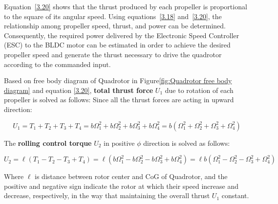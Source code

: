 \begin{small}
Equation~\eqref{3.20} shows that the thrust produced by each propeller is proportional 
to the square of its angular speed. Using equations~\eqref{3.18} and~\eqref{3.20}, the 
relationship among propeller speed, thrust, and power can be determined. Consequently, 
the required power delivered by the Electronic Speed Controller (ESC) to the BLDC motor 
can be estimated in order to achieve the desired propeller speed and generate the thrust 
necessary to drive the quadrotor according to the commanded input.








Based on free body diagram of Quadrotor in Figure\ref{fig:Quadrotor free body diagram} and equation \eqref{3.20}, 
\textbf{total thrust force} $U_1$ due to rotation of each propeller is solved as follows: 
Since all the thrust forces are acting in upward direction:

\begin{equation}
U_1 = T_1 + T_2 + T_3 + T_4 = b\Omega_1^2 + b\Omega_2^2 + b\Omega_3^2 + b\Omega_4^2 = b(\Omega_1^2 + \Omega_2^2 + \Omega_3^2 + \Omega_4^2)
\label{3.21}
\end{equation}


The \textbf{rolling control torque} $U_2$ in positive $\phi$ direction is solved as follows:

\begin{equation}
U_2 = \ell (T_1 - T_2 - T_3 + T_4) 
    = \ell (b\Omega_1^2 - b\Omega_2^2 - b\Omega_3^2 + b\Omega_4^2)  = \ell b(\Omega_1^2 - \Omega_2^2 - \Omega_3^2 + \Omega_4^2)
    \label{3.22}
\end{equation}


Where $\ell$ is distance between rotor center and CoG of Quadrotor, and the positive and 
negative sign indicate the rotor at which their speed increase and decrease, respectively, 
in the way that maintaining the overall thrust $U_1$ constant.



\end{small}
